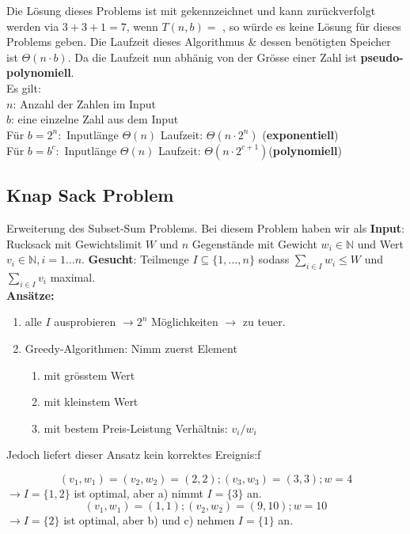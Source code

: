 \documentclass[a4paper]{article}
\newcommand*\circled[1]{\tikz[baseline=(char.base)]{
            \node[shape=circle,draw,inner sep=1.2pt] (char) {#1};}}
\begin{document}
Die Lösung dieses Problems ist mit \textcolor{red}{\circled{1}} gekennzeichnet und kann zurückverfolgt werden via $3 + 3 + 1 = 7$, wenn $T(n,b) =$ \textcolor{red}{\circled{0}}, so würde es keine Lösung für dieses Problems geben. 
Die Laufzeit dieses Algorithmus \& dessen benötigten Speicher ist $\Theta(n\cdot b)$. Da die Laufzeit nun abhänig von der Grösse einer Zahl ist \textbf{pseudo-polynomiell}. \\
Es gilt: \\ 
$n$: Anzahl der Zahlen im Input \\
$b$: eine einzelne Zahl aus dem Input\\
Für $b= 2^n: $ Inputlänge $\Theta(n)$ Laufzeit: $\Theta(n\cdot2^n)$ (\textbf{exponentiell}) \\
Für $b= b^c: $ Inputlänge $\Theta(n)$ Laufzeit: $\Theta(n\cdot2^{c+1})$(\textbf{polynomiell})

\subsection{Knap Sack Problem}
Erweiterung des Subset-Sum Problems. Bei diesem Problem haben wir als \textbf{Input}: Rucksack mit Gewichtslimit $W$ und $n$ Gegenstände mit Gewicht $w_i \in \mathbb{N}$ und Wert $v_i \in \mathbb{N}, i = 1\dots n$. \textbf{Gesucht}: Teilmenge $I \subseteq \lbrace 1,\dots ,n \rbrace$ sodass $\sum_{i\in I} w_i \leq W$ und $\sum_{i\in I} v_i$ maximal. \\ 
\textbf{Ansätze:} 
\begin{enumerate}
    \item alle $I$ ausprobieren $\rightarrow 2^n$ Möglichkeiten $\rightarrow$ zu teuer.
    \item Greedy-Algorithmen: Nimm zuerst Element 
    \begin{enumerate}
        \item mit grösstem Wert
        \item mit kleinstem Wert
        \item mit bestem Preis-Leistung Verhältnis: $v_i /w_i$
    \end{enumerate}
\end{enumerate}
Jedoch liefert dieser Ansatz kein korrektes Ereignis:f

\begin{equation*}
    (v_1,w_1) = (v_2,w_2) = (2,2) ; (v_3,w_3) = (3,3) ; w = 4
\end{equation*}
$\rightarrow I = \lbrace 1,2\rbrace$ ist optimal, aber a) nimmt $I = \lbrace 3\rbrace$ an.
\begin{equation*}
    (v_1,w_1) = (1,1) ; (v_2,w_2) = (9,10) ; w = 10
\end{equation*}
$\rightarrow I = \lbrace 2\rbrace$ ist optimal, aber b) und c) nehmen $I = \lbrace 1\rbrace$ an.
\end{document}
